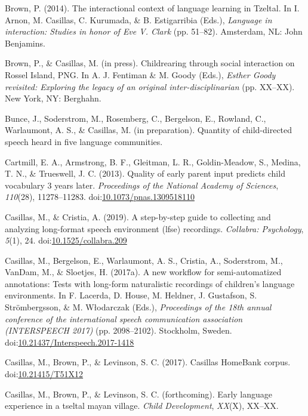 \documentclass[,man,floatsintext]{apa6}
\begin{document}
\hypertarget{ref-brown2014interactional}{}
Brown, P. (2014). The interactional context of language learning in
Tzeltal. In I. Arnon, M. Casillas, C. Kurumada, \& B. Estigarribia
(Eds.), \emph{Language in interaction: Studies in honor of Eve V. Clark}
(pp. 51--82). Amsterdam, NL: John Benjamins.

\hypertarget{ref-brownIPchildrearing}{}
Brown, P., \& Casillas, M. (in press). Childrearing through social
interaction on Rossel Island, PNG. In A. J. Fentiman \& M. Goody (Eds.),
\emph{Esther Goody revisited: Exploring the legacy of an original
inter-disciplinarian} (pp. XX--XX). New York, NY: Berghahn.

\hypertarget{ref-bunceIPCDS}{}
Bunce, J., Soderstrom, M., Rosemberg, C., Bergelson, E., Rowland, C.,
Warlaumont, A. S., \& Casillas, M. (in preparation). Quantity of
child-directed speech heard in five language communities.

\hypertarget{ref-cartmill2013quality}{}
Cartmill, E. A., Armstrong, B. F., Gleitman, L. R., Goldin-Meadow, S.,
Medina, T. N., \& Trueswell, J. C. (2013). Quality of early parent input
predicts child vocabulary 3 years later. \emph{Proceedings of the
National Academy of Sciences}, \emph{110}(28), 11278--11283.
doi:\href{https://doi.org/10.1073/pnas.1309518110}{10.1073/pnas.1309518110}

\hypertarget{ref-casillas2019stepbystep}{}
Casillas, M., \& Cristia, A. (2019). A step-by-step guide to collecting
and analyzing long-format speech environment (lfse) recordings.
\emph{Collabra: Psychology}, \emph{5}(1), 24.
doi:\href{https://doi.org/10.1525/collabra.209}{10.1525/collabra.209}

\hypertarget{ref-casillas2017workflow}{}
Casillas, M., Bergelson, E., Warlaumont, A. S., Cristia, A., Soderstrom,
M., VanDam, M., \& Sloetjes, H. (2017a). A new workflow for
semi-automatized annotations: Tests with long-form naturalistic
recordings of children's language environments. In F. Lacerda, D. House,
M. Heldner, J. Gustafson, S. Strömbergsson, \& M. Włodarczak (Eds.),
\emph{Proceedings of the 18th annual conference of the international
speech communication association (INTERSPEECH 2017)} (pp. 2098--2102).
Stockholm, Sweden.
doi:\href{https://doi.org/10.21437/Interspeech.2017-1418}{10.21437/Interspeech.2017-1418}

\hypertarget{ref-Casillas-HB}{}
Casillas, M., Brown, P., \& Levinson, S. C. (2017). Casillas HomeBank
corpus. doi:\href{https://doi.org/10.21415/T51X12}{10.21415/T51X12}

\hypertarget{ref-casillasFCearly}{}
Casillas, M., Brown, P., \& Levinson, S. C. (forthcoming). Early
language experience in a tseltal mayan village. \emph{Child
Development}, \emph{XX}(X), XX--XX.
\end{document}
